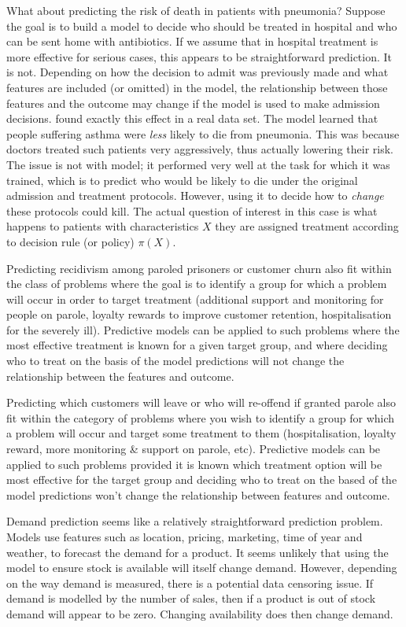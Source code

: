 \documentclass[11pt,a4paper,twoside]{report}
\theoremstyle{plain}
\theoremstyle{definition}
\begin{document}
What about predicting the risk of death in patients with pneumonia? Suppose the goal is to build a model to decide who should be treated in hospital and who can be sent home with antibiotics. If we assume that in hospital treatment is more effective for serious cases, this appears to be straightforward prediction. It is not. Depending on how the decision to admit was previously made and what features are included (or omitted) in the model, the relationship between those features and the outcome may change if the model is used to make admission decisions. \citet{Caruana2015} found exactly this effect in a real data set. The model learned that people suffering asthma were \emph{less} likely to die from pneumonia. This was because doctors treated such patients very aggressively, thus actually lowering their risk. The issue is not with model; it performed very well at the task for which it was trained, which is to predict who would be likely to die under the original admission and treatment protocols. However, using it to decide how to \emph{change} these protocols could kill. The actual question of interest in this case is what happens to patients with characteristics $X$ they are assigned treatment according to decision rule (or policy) $\pi(X)$. 

Predicting recidivism among paroled prisoners or customer churn also fit within the class of problems where the goal is to identify a group for which a problem will occur in order to target treatment (additional support and monitoring for people on parole, loyalty rewards to improve customer retention, hospitalisation for the severely ill). Predictive models can be applied to such problems where the most effective treatment is known for a given target group, and where deciding who to treat on the basis of the model predictions will not change the relationship between the features and outcome.

Predicting which customers will leave or who will re-offend if granted parole also fit within the category of problems where you wish to identify a group for which a problem will occur and target some treatment to them (hospitalisation, loyalty reward, more monitoring \& support on parole, etc). Predictive models can be applied to such problems provided it is known which treatment option will be most effective for the target group and deciding who to treat on the based of the model predictions won't change the relationship between features and outcome.

Demand prediction seems like a relatively straightforward prediction problem. Models use features such as location, pricing, marketing, time of year and weather, to forecast the demand for a product. It seems unlikely that using the model to ensure stock is available will itself change demand. However, depending on the way demand is measured, there is a potential data censoring issue. If demand is modelled by the number of sales, then if a product is out of stock demand will appear to be zero. Changing availability does then change demand.
   
\end{document}
